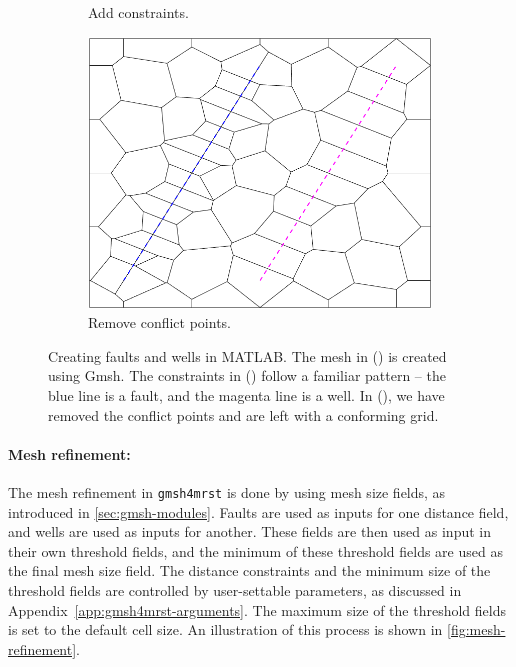\begin{figure}[htp]
\begin{subfigure}[b]{0.32\textwidth}
        \caption{Add constraints.}
        \label{fig:MATLAB-constraints-2}
    \end{subfigure}
    \begin{subfigure}[b]{0.32\textwidth}
        \centering
        \includegraphics[width=\textwidth]{report/Images/Combining software/Constraints in MATLAB/constraints_MATLAB_3.png}
        \caption{Remove conflict points.}
        \label{fig:MATLAB-constraints-3}
    \end{subfigure}
    \caption[Creating faults and wells in MATLAB]{Creating faults and wells in MATLAB. The mesh in () is created using Gmsh. The constraints in () follow a familiar pattern -- the blue line is a fault, and the magenta line is a well. In (), we have removed the conflict points and are left with a conforming grid.}
    \label{fig:MATLAB-constraints}
\end{figure}

\paragraph{Mesh refinement:}
The mesh refinement in \verb|gmsh4mrst| is done by using mesh size fields, as introduced in \autoref{sec:gmsh-modules}. Faults are used as inputs for one distance field, and wells are used as inputs for another. These fields are then used as input in their own threshold fields, and the minimum of these threshold fields are used as the final mesh size field. The distance constraints and the minimum size of the threshold fields are controlled by user-settable parameters, as discussed in Appendix~\ref{app:gmsh4mrst-arguments}. The maximum size of the threshold fields is set to the default cell size. An illustration of this process is shown in \autoref{fig:mesh-refinement}.

